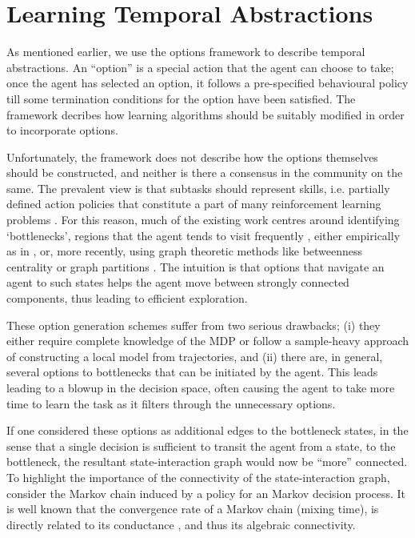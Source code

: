 \section{Learning Temporal Abstractions}

As mentioned earlier, we use the options framework to describe temporal
abstractions. An ``option'' is a special action that the agent can
choose to take; once the agent has selected an option, it follows
a pre-specified behavioural policy till some termination conditions for
the option have been satisfied. The framework decribes how learning
algorithms should be suitably modified in order to incorporate options. 

Unfortunately, the framework does not describe how the options
themselves should be constructed, and neither is there a consensus in
the community on the same. The prevalent view is that subtasks should
represent skills, i.e. partially defined action policies that constitute
a part of many reinforcement learning problems \citep{Thrun1995}. For
this reason, much of the existing work centres around identifying
`bottlenecks', regions that the agent tends to visit frequently
\citep{McGovern2001}, either empirically as in \citep{McGovern2001}, or,
more recently, using graph theoretic methods like betweenness centrality
\citep{Simsek2008} or graph partitions \citep{Menache2002}. The
intuition is that options that navigate an agent to such states helps
the agent move between strongly connected components, thus leading to
efficient exploration. 

These option generation schemes suffer from two serious drawbacks; (i)
they either require complete knowledge of the MDP or follow
a sample-heavy approach of constructing a local model from trajectories,
and (ii) there are, in general, several options to bottlenecks that can
be initiated by the agent. This leads leading to a blowup in the
decision space, often causing the agent to take more time to learn the
task as it filters through the unnecessary options.

If one considered these options as additional edges to the bottleneck
states, in the sense that a single decision is sufficient to transit the
agent from a state, to the bottleneck, the resultant state-interaction
graph would now be ``more'' connected. To highlight the importance of
the connectivity of the state-interaction graph, consider the Markov
chain induced by a policy for an Markov decision process. It is well
known that the convergence rate of a Markov chain (mixing time), is
directly related to its conductance \citep{Jerrum1988}, and thus its
algebraic connectivity.

